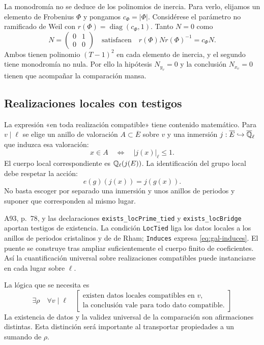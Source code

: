 La monodromía no se deduce de los polinomios de inercia.
Para verlo, elijamos un elemento de Frobenius $\Phi$ y pongamos
$c_\Phi=|\Phi|$. Considérese el parámetro no ramificado de Weil
con $r(\Phi)=\operatorname{diag}(c_\Phi,1)$.
Tanto $N=0$ como
\begin{equation}
 N=\begin{pmatrix}0&1\\0&0\end{pmatrix}
 \quad\text{satisfacen}\quad
 r(\Phi)Nr(\Phi)^{-1}=c_\Phi N.
 \label{eq:gal-monodromia}
\end{equation}
Ambos tienen polinomio $(T-1)^2$ en cada elemento de inercia,
y el segundo tiene monodromía no nula.
Por ello la hipótesis $N_{y_v}=0$ y la conclusión $N_{x_v}=0$
tienen que acompañar la comparación mansa.

\subsection{Realizaciones locales con testigos}

La expresión «en toda realización compatible» tiene contenido
matemático. Para $v\mid\ell$ se elige un anillo de valoración
$A\subset\overline E$ sobre $v$ y una inmersión
$j:\overline E\hookrightarrow\overline{\mathbb{Q}}_\ell$ que induzca
esa valoración:
\begin{equation}
 x\in A\quad\Longleftrightarrow\quad |j(x)|_\ell\le1.
 \label{eq:gal-induces}
\end{equation}
El cuerpo local correspondiente es $\mathbb{Q}_\ell(j(E))$.
La identificación del grupo local debe respetar la acción:
\begin{equation}
 e(g)(j(x))=j(g(x)).
 \label{eq:gal-bridge}
\end{equation}
No basta escoger por separado una inmersión y unos anillos
de periodos y suponer que corresponden al mismo lugar.

A93, p.~78, y las declaraciones
\texttt{exists\_locPrime\_tied} y \texttt{exists\_locBridge}
aportan testigos de existencia. La condición \texttt{LocTied}
liga los datos locales a los anillos de periodos cristalinos
y de de Rham; \texttt{Induces} expresa
\eqref{eq:gal-induces}. El puente se construye tras ampliar
suficientemente el cuerpo finito de coeficientes.
Así la cuantificación universal sobre realizaciones compatibles
puede instanciarse en cada lugar sobre $\ell$.

La lógica que se necesita es
\begin{equation}
 \exists\rho\quad\forall v\mid\ell\quad
 \left[
   \begin{array}{l}
    \text{existen datos locales compatibles en }v,\\
    \text{la conclusión vale para todo dato compatible.}
   \end{array}
 \right]
 \label{eq:gal-cuantificadores-locales}
\end{equation}
La existencia de datos y la validez universal de la comparación
son afirmaciones distintas. Esta distinción será importante al
transportar propiedades a un sumando de $\rho$.

